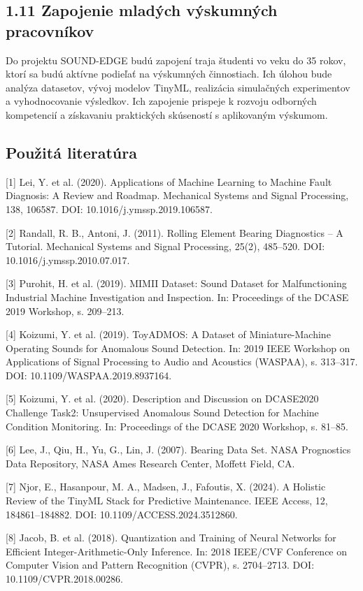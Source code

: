 \documentclass[10pt,a4paper]{article}
\begin{document}
\subsection*{1.11 Zapojenie mladých
výskumných pracovníkov}

Do projektu SOUND-EDGE budú zapojení traja študenti vo veku do 35 rokov, ktorí sa budú aktívne podieľať na výskumných činnostiach. Ich úlohou bude analýza datasetov, vývoj modelov TinyML, realizácia simulačných experimentov a vyhodnocovanie výsledkov. Ich zapojenie prispeje k rozvoju odborných kompetencií a získavaniu praktických skúseností s aplikovaným výskumom.

\subsection*{Použitá literatúra}

[1] Lei, Y. et al. (2020). Applications of Machine Learning to Machine Fault Diagnosis: A Review and Roadmap. Mechanical Systems and Signal Processing, 138, 106587. DOI: 10.1016/j.ymssp.2019.106587.

[2] Randall, R. B., Antoni, J. (2011). Rolling Element Bearing Diagnostics – A Tutorial. Mechanical Systems and Signal Processing, 25(2), 485–520. DOI: 10.1016/j.ymssp.2010.07.017.

[3] Purohit, H. et al. (2019). MIMII Dataset: Sound Dataset for Malfunctioning Industrial Machine Investigation and Inspection. In: Proceedings of the DCASE 2019 Workshop, s. 209–213.

[4] Koizumi, Y. et al. (2019). ToyADMOS: A Dataset of Miniature-Machine Operating Sounds for Anomalous Sound Detection. In: 2019 IEEE Workshop on Applications of Signal Processing to Audio and Acoustics (WASPAA), s. 313–317. DOI: 10.1109/WASPAA.2019.8937164.

[5] Koizumi, Y. et al. (2020). Description and Discussion on DCASE2020 Challenge Task2: Unsupervised Anomalous Sound Detection for Machine Condition Monitoring. In: Proceedings of the DCASE 2020 Workshop, s. 81–85.

[6] Lee, J., Qiu, H., Yu, G., Lin, J. (2007). Bearing Data Set. NASA Prognostics Data Repository, NASA Ames Research Center, Moffett Field, CA.

[7] Njor, E., Hasanpour, M. A., Madsen, J., Fafoutis, X. (2024). A Holistic Review of the TinyML Stack for Predictive Maintenance. IEEE Access, 12, 184861–184882. DOI: 10.1109/ACCESS.2024.3512860.

[8] Jacob, B. et al. (2018). Quantization and Training of Neural Networks for Efficient Integer-Arithmetic-Only Inference. In: 2018 IEEE/CVF Conference on Computer Vision and Pattern Recognition (CVPR), s. 2704–2713. DOI: 10.1109/CVPR.2018.00286.
\end{document}
